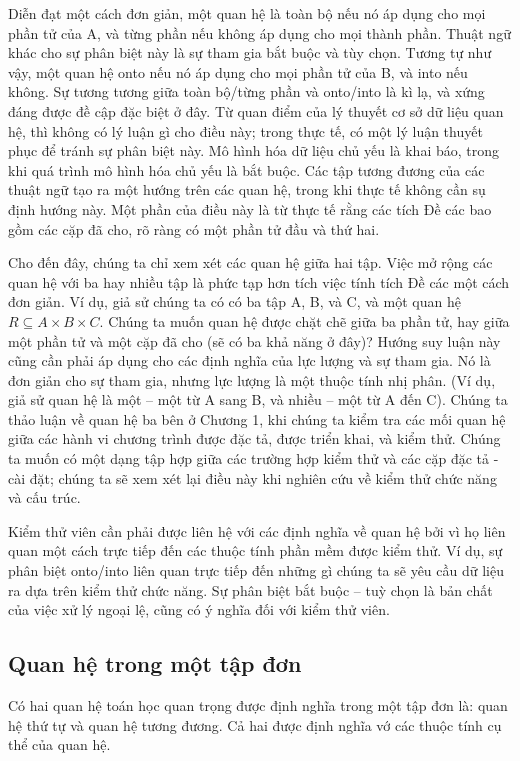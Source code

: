 \documentclass[11pt,a4paper,oneside]{article}
\begin{document}
Diễn đạt một cách đơn giản, một quan hệ là toàn bộ nếu nó áp dụng cho mọi phần tử của A, và từng phần nếu không áp dụng cho mọi thành phần. Thuật ngữ khác cho sự phân biệt này là sự tham gia bắt buộc và tùy chọn. Tương tự như vậy, một quan hệ onto nếu nó áp dụng cho mọi phần tử của B, và into nếu không. Sự tương tương giữa toàn bộ/từng phần và onto/into là kì lạ, và xứng đáng được đề cập đặc biệt ở đây. Từ quan điểm của lý thuyết cơ sở dữ liệu quan hệ, thì không có lý luận gì cho điều này; trong thực tế, có một lý luận thuyết phục để tránh sự phân biệt này. Mô hình hóa dữ liệu chủ yếu là khai báo, trong khi quá trình mô hình hóa chủ yếu là bắt buộc. Các tập tương đương của các thuật ngữ tạo ra một hướng trên các quan hệ, trong khi thực tế không cần sụ định hướng này. Một phần của điều này là từ thực tế rằng các tích Đề các bao gồm các cặp đã cho, rõ ràng có một phần tử đầu và thứ hai.

Cho đến đây, chúng ta chỉ xem xét các quan hệ giữa hai tập. Việc mở rộng các quan hệ với ba hay nhiều tập là phức tạp hơn tích việc tính tích Đề các một cách đơn giản. Ví dụ, giả sử chúng ta có có ba tập A, B, và C, và một quan hệ $ R \subseteq A \times B \times C $. Chúng ta muốn quan hệ được chặt chẽ giữa ba phần tử, hay giữa một phần tử và một cặp đã cho (sẽ có ba khả năng ở đây)? Hướng suy luận này cũng cần phải áp dụng cho các định nghĩa của lực lượng và sự tham gia. Nó là đơn giản cho sự tham gia, nhưng lực lượng là một thuộc tính nhị phân. (Ví dụ, giả sử quan hệ là một – một từ A sang B, và nhiều – một từ A đến C). Chúng ta thảo luận về quan hệ ba bên ở Chương 1, khi chúng ta kiểm tra các mối quan hệ giữa các hành vi chương trình được đặc tả, được triển khai, và kiểm thử. Chúng ta muốn có một dạng tập hợp giữa các trường hợp kiểm thử và các cặp đặc tả - cài đặt; chúng ta sẽ xem xét lại điều này khi nghiên cứu về kiểm thử chức năng và cấu trúc.

Kiểm thử viên cần phải được liên hệ với các định nghĩa về quan hệ bởi vì họ liên quan một cách trực tiếp đến các thuộc tính phần mềm được kiểm thử. Ví dụ, sự phân biệt onto/into liên quan trực tiếp đến những gì chúng ta sẽ yêu cầu dữ liệu ra dựa trên kiểm thử chức năng. Sự phân biệt bắt buộc – tuỳ chọn là bản chất của việc xử lý ngoại lệ, cũng có ý nghĩa đối với kiểm thử viên.

\subsection{Quan hệ trong một tập đơn}
Có hai quan hệ toán học quan trọng được định nghĩa trong một tập đơn là: quan hệ thứ tự và quan hệ tương đương. Cả hai được định nghĩa vớ các thuộc tính cụ thể của quan hệ.
\end{document}
